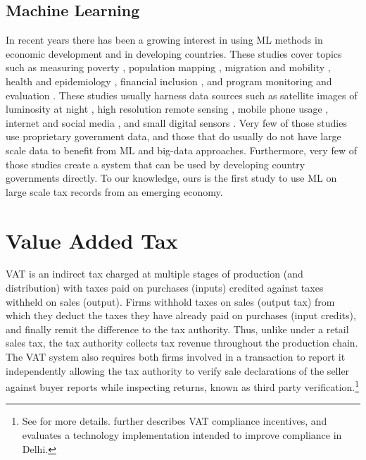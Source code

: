 \subsection{Machine Learning}
\label{subsec:literature-ml}
In recent years there has been a growing interest in using ML methods in economic development and in developing countries. These studies cover topics such as measuring poverty \citep{blumenstock2015predicting, xie2015transfer,chen2011using},
population mapping \citep{deville2014dynamic}, migration and mobility \citep{lu2016unveiling}, health and epidemiology \citep{wesolowski2014quantifying}, financial inclusion \citep{bjorkegren2017behavior}, and program monitoring and evaluation \citep{wilson2015comparing}. These studies usually harness data sources such as satellite images of luminosity at night \citep{chen2011using}, high resolution remote sensing \citep{xie2015transfer}, mobile phone usage \citep{blumenstock2015predicting, deville2014dynamic, lu2016unveiling, bjorkegren2017behavior}, internet and social media \citep{llorente2015social}, and small digital sensors \citep{wilson2015comparing}. Very few of those studies use proprietary government data, and those that do usually do not have large scale data to benefit from ML and big-data approaches. Furthermore, very few of those studies create a system that can be used by developing country governments directly. To our knowledge, ours is the first study to use ML on large scale tax records from an emerging economy.

\section{Value Added Tax}
\label{sec:vat}
VAT is an indirect tax charged at multiple stages of production (and distribution) with taxes paid on purchases (inputs) credited against taxes withheld on sales (output). Firms withhold taxes on sales (output tax) from which they deduct the taxes they have already paid on purchases (input credits), and finally remit the difference to the tax authority. Thus, unlike under a retail sales tax, the tax authority collects tax revenue throughout the production chain. The VAT system also requires both firms involved in a transaction to report it independently allowing the tax authority to verify sale declarations of the seller against buyer reports while inspecting returns, known as third party verification.\footnote{See \cite{ITD2005} for more details.\cite{mittal2017vat} further describes VAT compliance incentives, and evaluates a technology implementation intended to improve compliance in Delhi. }

